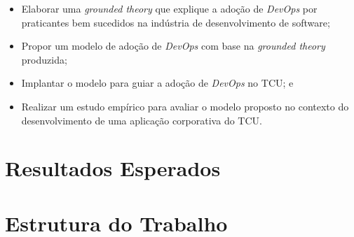 \begin{itemize}
\item Elaborar uma \textit{grounded theory} que explique a adoção
de \textit{DevOps} por praticantes bem sucedidos na indústria de desenvolvimento
de software;
\item Propor um modelo de adoção de \textit{DevOps} com base na
\textit{grounded theory} produzida;
\item Implantar o modelo para guiar a adoção de \textit{DevOps} no \acrshort{TCU}; e
\item Realizar um estudo empírico para avaliar o modelo proposto no contexto
do desenvolvimento de uma aplicação corporativa do \acrshort{TCU}.
\end{itemize}

\section{Resultados Esperados}

\section{Estrutura do Trabalho}


